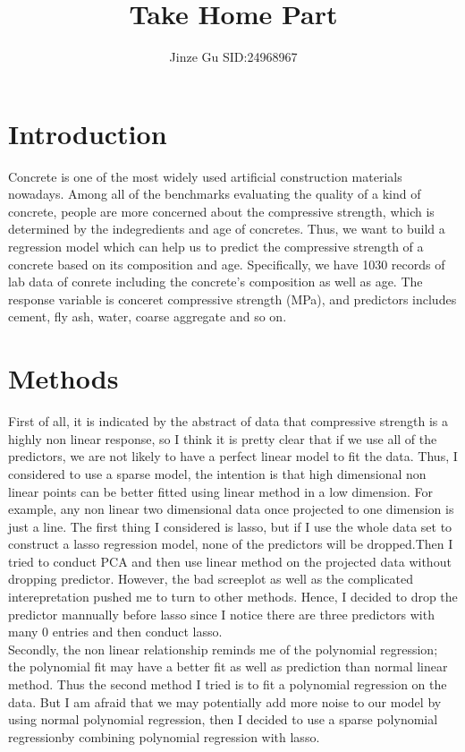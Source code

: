 \documentclass{article}\usepackage[]{graphicx}\usepackage[]{color}
\begin{document}
\title{Take Home Part}


\author{Jinze Gu SID:24968967}


\maketitle

\section*{Introduction}
Concrete is one of the most widely used artificial construction materials nowadays. Among all of the benchmarks evaluating the quality of a kind of concrete, people are more concerned about the compressive strength, which is determined by the indegredients and age of concretes. Thus, we want to build a regression model which can help us to predict the compressive strength of a concrete based on its composition and age. Specifically, we have 1030 records of lab data of conrete including the concrete's composition as well as age. The response variable is conceret compressive strength (MPa), and predictors includes cement, fly ash, water, coarse aggregate and so on. 

\section*{Methods}
First of all, it is indicated by the abstract of data that compressive strength is a highly non linear response, so I think it is pretty clear that if we use all of the predictors, we are not likely to have a perfect linear model to fit the data. Thus, I considered to use a sparse model, the intention is that high dimensional non linear points can be better fitted using linear method in a low dimension. For example, any non linear two dimensional data once projected to one dimension is just a line. The first thing I considered is lasso, but if I use the whole data set to construct a lasso regression model, none of the predictors will be dropped.Then I tried to conduct PCA and then use linear method on the projected data without dropping predictor. However, the bad screeplot as well as the complicated interepretation pushed me to turn to other methods. Hence, I decided to drop the predictor mannually before lasso since I notice there are three predictors with many 0 entries and then conduct lasso. \\

Secondly, the non linear relationship reminds me of the polynomial regression; the polynomial fit may have a better fit as well as prediction than normal linear method. Thus the second method I tried is to fit a polynomial regression on the data. But I am afraid that we may potentially add more noise to our model by using normal polynomial regression, then I decided to use a sparse polynomial regressionby combining polynomial regression with lasso.\\
\end{document}
